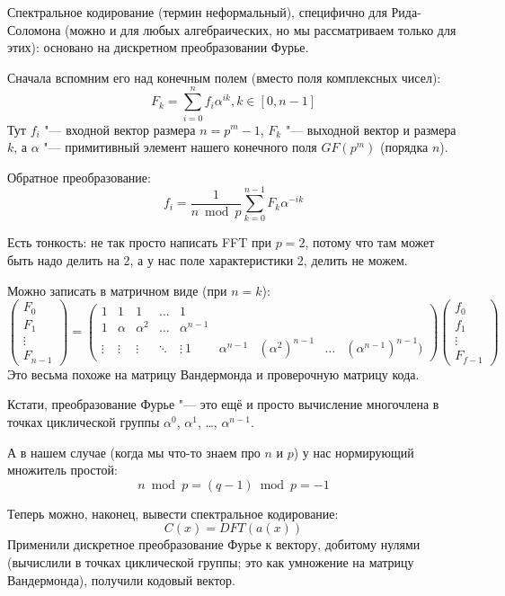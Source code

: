 Спектральное кодирование (термин неформальный), специфично для Рида-Соломона
(можно и для любых алгебраических, но мы рассматриваем только для этих):
основано на дискретном преобразовании Фурье.

Сначала вспомним его над конечным полем (вместо поля комплексных чисел):
\[
F_k = \sum_{i=0}^n f_i \alpha^{ik}, k \in [0, n - 1]
\]
Тут $f_i$ "--- входной вектор размера $n=p^m-1$, $F_k$ "--- выходной вектор и размера $k$,
а $\alpha$ "--- примитивный элемент нашего конечного поля $GF(p^m)$ (порядка $n$).

Обратное преобразование:
\[
f_i = \frac{1}{n \bmod p} \sum_{k=0}^{n-1} F_k \alpha^{-ik}
\]

Есть тонкость: не так просто написать FFT при $p=2$,
потому что там может быть надо делить на 2, а у нас поле характеристики 2, делить не можем.

Можно записать в матричном виде (при $n=k$):
\[
\begin{pmatrix}
F_0 \\ F_1 \\ \vdots \\ F_{n-1}
\end{pmatrix}
=
\begin{pmatrix}
1 & 1 & 1 & \dots & 1 \\
1 & \alpha & \alpha^2 & \dots & \alpha^{n-1} \\
\vdots & \vdots & \vdots & \ddots & \vdots \
1 & \alpha^{n-1} & (\alpha^2)^{n-1} & \dots & (\alpha^{n-1})^{n-1})
\end{pmatrix}
\begin{pmatrix}
f_0 \\ f_1 \\ \vdots \\ F_{f-1}
\end{pmatrix}
\]
Это весьма похоже на матрицу Вандермонда и проверочную матрицу кода.

Кстати, преобразование Фурье "--- это ещё и просто вычисление
многочлена в точках циклической группы $\alpha^0$, $\alpha^1$, \dots, $\alpha^{n-1}$.

А в нашем случае (когда мы что-то знаем про $n$ и $p$) у нас нормирующий множитель простой:
\[
n \bmod p = (q - 1) \bmod p = -1
\]

Теперь можно, наконец, вывести спектральное кодирование:
\[
C(x) = DFT(a(x))
\]
Применили дискретное преобразование Фурье к вектору, добитому нулями
(вычислили в точках циклической группы; это как умножение на матрицу Вандермонда),
получили кодовый вектор.

